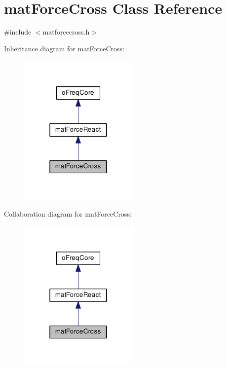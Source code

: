 \hypertarget{classmat_force_cross}{\section{mat\-Force\-Cross Class Reference}
\label{classmat_force_cross}
}


{\ttfamily \#include $<$matforcecross.\-h$>$}



Inheritance diagram for mat\-Force\-Cross\-:\nopagebreak
\begin{figure}[H]
\begin{center}
\leavevmode
\includegraphics[width=166pt]{classmat_force_cross__inherit__graph}
\end{center}
\end{figure}


Collaboration diagram for mat\-Force\-Cross\-:\nopagebreak
\begin{figure}[H]
\begin{center}
\leavevmode
\includegraphics[width=166pt]{classmat_force_cross__coll__graph}
\end{center}
\end{figure}
